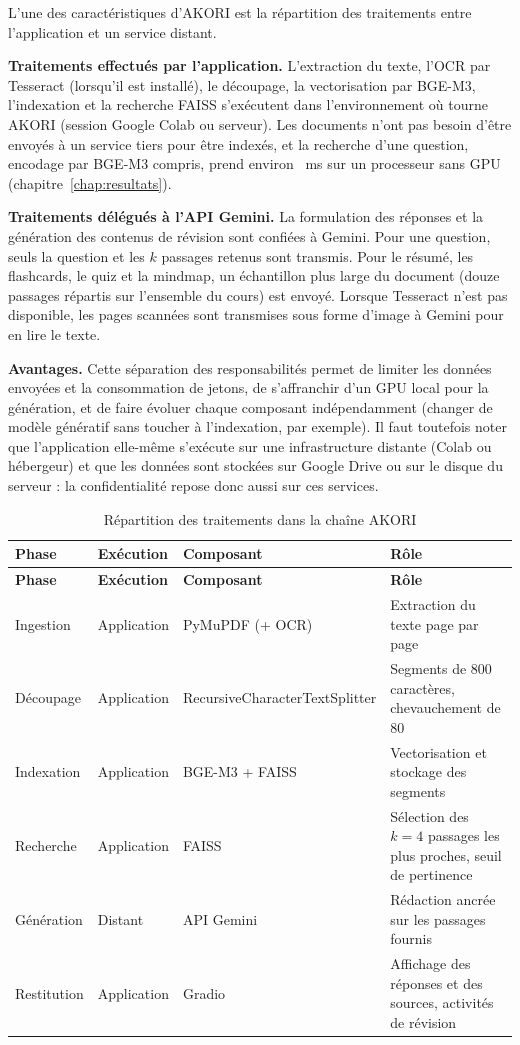 \documentclass[12pt,a4paper,oneside]{report}
\begin{document}
L'une des caractéristiques d'AKORI est la répartition des traitements entre l'application et un service distant.

\textbf{Traitements effectués par l'application.} L'extraction du texte, l'OCR par Tesseract (lorsqu'il est installé), le découpage, la vectorisation par BGE-M3, l'indexation et la recherche FAISS s'exécutent dans l'environnement où tourne AKORI (session Google Colab ou serveur). Les documents n'ont pas besoin d'être envoyés à un service tiers pour être indexés, et la recherche d'une question, encodage par BGE-M3 compris, prend environ \RechMed~ms sur un processeur sans GPU (chapitre~\ref{chap:resultats}).

\textbf{Traitements délégués à l'API Gemini.} La formulation des réponses et la génération des contenus de révision sont confiées à Gemini. Pour une question, seuls la question et les $k$ passages retenus sont transmis. Pour le résumé, les flashcards, le quiz et la mindmap, un échantillon plus large du document (douze passages répartis sur l'ensemble du cours) est envoyé. Lorsque Tesseract n'est pas disponible, les pages scannées sont transmises sous forme d'image à Gemini pour en lire le texte.

\textbf{Avantages.} Cette séparation des responsabilités permet de limiter les données envoyées et la consommation de jetons, de s'affranchir d'un GPU local pour la génération, et de faire évoluer chaque composant indépendamment (changer de modèle génératif sans toucher à l'indexation, par exemple). Il faut toutefois noter que l'application elle-même s'exécute sur une infrastructure distante (Colab ou hébergeur) et que les données sont stockées sur Google Drive ou sur le disque du serveur : la confidentialité repose donc aussi sur ces services.

\begin{longtable}{p{}|p{}|p{}|p{}}
\caption{Répartition des traitements dans la chaîne AKORI}\label{tab:repartition}\\
\hline
\textbf{Phase} & \textbf{Exécution} & \textbf{Composant} & \textbf{Rôle} \\ \hline
\endfirsthead
\hline
\textbf{Phase} & \textbf{Exécution} & \textbf{Composant} & \textbf{Rôle} \\ \hline
\endhead
Ingestion & Application & PyMuPDF (+ OCR) & Extraction du texte page par page \\ \hline
Découpage & Application & Recursive\-Character\allowbreak Text\-Splitter & Segments de 800 caractères, chevauchement de 80 \\ \hline
Indexation & Application & BGE-M3 + FAISS & Vectorisation et stockage des segments \\ \hline
Recherche & Application & FAISS & Sélection des $k = 4$ passages les plus proches, seuil de pertinence \\ \hline
Génération & Distant & API Gemini & Rédaction ancrée sur les passages fournis \\ \hline
Restitution & Application & Gradio & Affichage des réponses et des sources, activités de révision \\ \hline
\end{longtable}
\end{document}
